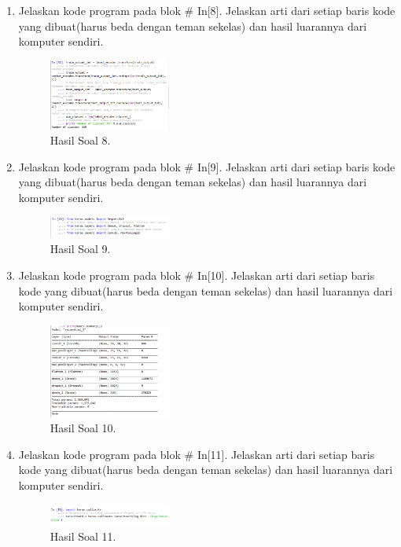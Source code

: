 \begin{enumerate}
	\item Jelaskan kode program pada blok \# In[8]. Jelaskan arti dari setiap baris kode yang dibuat(harus beda dengan teman sekelas) dan hasil luarannya dari komputer sendiri.
	\hfill\break
	
	\begin{figure}[H]
	\centering
		\includegraphics[width=4cm]{figures/1174077/7/praktek_8.PNG}
		\caption{Hasil Soal 8.}
	\end{figure}

	\item Jelaskan kode program pada blok \# In[9]. Jelaskan arti dari setiap baris kode yang dibuat(harus beda dengan teman sekelas) dan hasil luarannya dari komputer sendiri.
	\hfill\break
	
	\begin{figure}[H]
	\centering
		\includegraphics[width=4cm]{figures/1174077/7/praktek_9.PNG}
		\caption{Hasil Soal 9.}
	\end{figure}

	\item Jelaskan kode program pada blok \# In[10]. Jelaskan arti dari setiap baris kode yang dibuat(harus beda dengan teman sekelas) dan hasil luarannya dari komputer sendiri.
	\hfill\break
	
	\begin{figure}[H]
	\centering
		\includegraphics[width=4cm]{figures/1174077/7/praktek_10.PNG}
		\caption{Hasil Soal 10.}
	\end{figure}

	\item Jelaskan kode program pada blok \# In[11]. Jelaskan arti dari setiap baris kode yang dibuat(harus beda dengan teman sekelas) dan hasil luarannya dari komputer sendiri.
	\hfill\break
	
	\begin{figure}[H]
	\centering
		\includegraphics[width=4cm]{figures/1174077/7/praktek_11.PNG}
		\caption{Hasil Soal 11.}
    \end{figure}
    

\end{enumerate}
